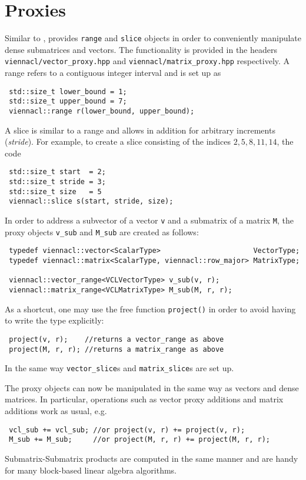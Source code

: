 \section{Proxies}
Similar to {\ublas}, {\ViennaCL} provides \lstinline|range| and \lstinline|slice| objects in order to conveniently manipulate dense submatrices and vectors. The functionality is
provided in the headers \lstinline|viennacl/vector_proxy.hpp| and \lstinline|viennacl/matrix_proxy.hpp| respectively.
A range refers to a contiguous integer interval and is set up as
\begin{lstlisting}
 std::size_t lower_bound = 1;
 std::size_t upper_bound = 7;
 viennacl::range r(lower_bound, upper_bound);
\end{lstlisting}
A slice is similar to a range and allows in addition for arbitrary increments (\emph{stride}).
For example, to create a slice consisting of the indices $2, 5, 8, 11, 14$, the code
\begin{lstlisting}
 std::size_t start  = 2;
 std::size_t stride = 3;
 std::size_t size   = 5
 viennacl::slice s(start, stride, size);
\end{lstlisting}

In order to address a subvector of a vector \lstinline|v| and a submatrix of a matrix \lstinline|M|, the proxy objects \lstinline|v_sub| and \lstinline|M_sub|
are created as follows:
\begin{lstlisting}
 typedef viennacl::vector<ScalarType>                      VectorType;
 typedef viennacl::matrix<ScalarType, viennacl::row_major> MatrixType;

 viennacl::vector_range<VCLVectorType> v_sub(v, r);
 viennacl::matrix_range<VCLMatrixType> M_sub(M, r, r);
\end{lstlisting}
As a shortcut, one may use the free function \lstinline|project()| in order to avoid having to write the type explicitly:
\begin{lstlisting}
 project(v, r);    //returns a vector_range as above
 project(M, r, r); //returns a matrix_range as above
\end{lstlisting}
In the same way \lstinline|vector_slice|s and \lstinline|matrix_slice|s are set up.

The proxy objects can now be manipulated in the same way as vectors and dense matrices. In particular, operations such as vector proxy additions and matrix
additions work as usual, e.g.
\begin{lstlisting}
 vcl_sub += vcl_sub; //or project(v, r) += project(v, r);
 M_sub += M_sub;     //or project(M, r, r) += project(M, r, r);
\end{lstlisting}
 Submatrix-Submatrix products are computed in the same manner and are handy for many block-based linear algebra algorithms.

